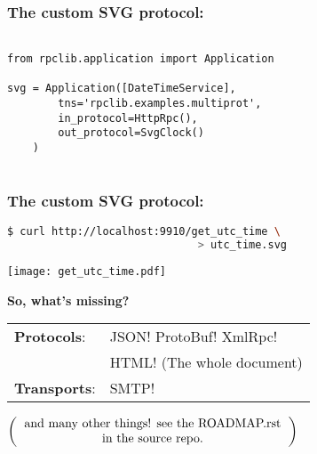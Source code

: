 \documentclass{beamer}
\begin{document}
\begin{frame}[fragile]
\frametitle{The custom SVG protocol:}
\begin{lstlisting}

from rpclib.application import Application

svg = Application([DateTimeService],
        tns='rpclib.examples.multiprot',
        in_protocol=HttpRpc(),
        out_protocol=SvgClock()
    )
 
\end{lstlisting}

\end{frame}

\begin{frame}[fragile]    
\frametitle{The custom SVG protocol:}

  \begin{lstlisting}[language=sh]
$ curl http://localhost:9910/get_utc_time \
                              > utc_time.svg
  \end{lstlisting}

  \begin{center}
    \texttt{[image: get\_utc\_time.pdf]}
  \end{center}
\end{frame}

\begin{frame}
  \huge
  \textbf{So, what's missing?}
  \begin{center}
\Large
  \begin{tabular}{ll}
    \textbf{Protocols}:  & JSON! ProtoBuf! XmlRpc! \\
                         & HTML! (The whole document) \\
    \textbf{Transports}: & SMTP!
  \end{tabular}

  \bigskip

  \large
  $\left(
    \begin{tabular}{c}
    and many other things! see the ROADMAP.rst \\
    in the source repo.
  \end{tabular}
  \right)$
 
  \end{center}
\end{frame}
\end{document}
